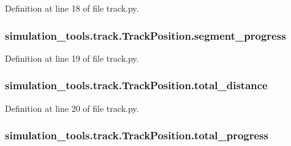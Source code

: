 Definition at line 18 of file track.\+py.

\subsubsection[{\texorpdfstring{segment\+\_\+progress}{segment_progress}}]{\setlength{\rightskip}{0pt plus 5cm}simulation\+\_\+tools.\+track.\+Track\+Position.\+segment\+\_\+progress}\hypertarget{classsimulation__tools_1_1track_1_1_track_position_a1ce2f49333cc2e6d5ac1094a3e919eeb}{}\label{classsimulation__tools_1_1track_1_1_track_position_a1ce2f49333cc2e6d5ac1094a3e919eeb}


Definition at line 19 of file track.\+py.

\subsubsection[{\texorpdfstring{total\+\_\+distance}{total_distance}}]{\setlength{\rightskip}{0pt plus 5cm}simulation\+\_\+tools.\+track.\+Track\+Position.\+total\+\_\+distance}\hypertarget{classsimulation__tools_1_1track_1_1_track_position_a488a7374a672827079686cf7fece12ee}{}\label{classsimulation__tools_1_1track_1_1_track_position_a488a7374a672827079686cf7fece12ee}


Definition at line 20 of file track.\+py.

\subsubsection[{\texorpdfstring{total\+\_\+progress}{total_progress}}]{\setlength{\rightskip}{0pt plus 5cm}simulation\+\_\+tools.\+track.\+Track\+Position.\+total\+\_\+progress}\hypertarget{classsimulation__tools_1_1track_1_1_track_position_a0471b3519ccab2dfd048ed02853f8a8d}{}\label{classsimulation__tools_1_1track_1_1_track_position_a0471b3519ccab2dfd048ed02853f8a8d}


